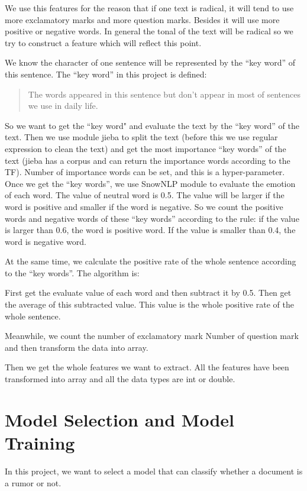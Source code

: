 \documentclass[12pt,a4paper]{article}
\begin{document}
We use this features for the reason that if one text is radical, it will tend to use more exclamatory marks and more question marks. Besides it will use more positive or negative words. In general the tonal of the text will be radical so we try to construct a feature which will reflect this point. 

We know the character of one sentence will be represented by the ``key word'' of this sentence. The ``key word'' in this project is defined:

\begin{quotation}
	The words appeared in this sentence but don't appear in most of sentences we use in daily life.
\end{quotation}

So we want to get the ``key word" and evaluate the text by the ``key word'' of the text. Then we use module jieba to split the text (before this we use regular expression to clean the text) and get the most importance ``key words'' of the text (jieba has a corpus and can return the importance words according to the TF). Number of importance words can be set, and this is a hyper-parameter. Once we get the ``key words'', we use SnowNLP module to evaluate the emotion of each word. The value of neutral word is 0.5. The value will be larger if the word is positive and smaller if the word is negative. So we count the positive words and negative words of these ``key words'' according to the rule: if the value is larger than 0.6, the word is positive word. If the value is smaller than 0.4, the word is negative word.

At the same time, we calculate the positive rate of the whole sentence according to the ``key words''. The algorithm is:

First get the evaluate value of each word and then subtract it by 0.5. Then get the average of this subtracted value. This value is the whole positive rate of the whole sentence.

Meanwhile, we count the number of exclamatory mark Number of question mark and then transform the data into array.

Then we get the whole features we want to extract. All the features have been transformed into array and all the data types are int or double. 


\section{Model Selection and Model Training}
In this project, we want to select a model that can classify whether a document is a rumor or not. 
\end{document}
